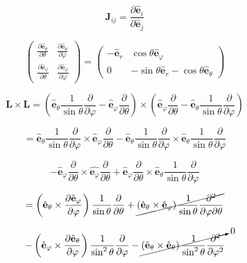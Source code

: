 \documentclass[12pt]{article}
\begin{document}
\[
    \textbf{J}_{ij} = \frac{\partial \hat{\mathbf{e}}_i}{\partial \hat{\mathbf{e}}_j}
\]

\[
    \left(
    \begin{array}{ccc}
            \frac{\partial \hat{\mathbf{e}}_\theta}{\partial \theta}  & \frac{\partial \hat{\mathbf{e}}_\theta}{\partial \varphi}  \\
            \frac{\partial \hat{\mathbf{e}}_\varphi}{\partial \theta} & \frac{\partial \hat{\mathbf{e}}_\varphi}{\partial \varphi}
        \end{array}
    \right)
    = \left(
    \begin{array}{ccc}
            - \hat{\mathbf{e}}_r & \cos{\theta} \hat{\mathbf{e}}_\varphi                                  \\
            0                    & - \sin \theta \hat{\mathbf{e}}_r - \cos \theta \hat{\mathbf{e}}_\theta
        \end{array}
    \right)
\]

\[
    \textbf{L} \times \textbf{L} =
    \left(
    \hat{\mathbf{e}}_\theta \frac{1}{\sin{\theta}} \frac{\partial}{\partial \varphi}
    - \hat{\mathbf{e}}_\varphi \frac{\partial}{\partial \theta}
    \right) \times
    \left(
    \hat{\mathbf{e}}_\varphi \frac{\partial}{\partial \theta}
    - \hat{\mathbf{e}}_\theta \frac{1}{\sin{\theta}} \frac{\partial}{\partial \varphi}
    \right)
\]

\[
    = \hat{\mathbf{e}}_\theta \frac{1}{\sin{\theta}} \frac{\partial}{\partial \varphi}
    \times \hat{\mathbf{e}}_\varphi \frac{\partial}{\partial \theta}
    - \hat{\mathbf{e}}_\theta \frac{1}{\sin{\theta}} \frac{\partial}{\partial \varphi}
    \times \hat{\mathbf{e}}_\theta \frac{1}{\sin{\theta}} \frac{\partial}{\partial \varphi}
\]

\[
    - \hat{\mathbf{e}}_\varphi \frac{\partial}{\partial \theta}
    \times \hat{\mathbf{e}_\varphi} \frac{\partial}{\partial \theta}
    + \hat{\mathbf{e}}_\varphi \frac{\partial}{\partial \theta}
    \times \hat{\mathbf{e}}_\theta \frac{1}{\sin{\theta}} \frac{\partial}{\partial \varphi}
\]

\[
    =\left(\hat{\mathbf{e}}_\theta \times \frac{\partial \hat{\mathbf{e}}_\varphi}{\partial \varphi}\right)
    \frac{1}{\sin{\theta}} \frac{\partial}{\partial \theta}
    + \cancel{\left(\hat{\mathbf{e}}_\theta \times \hat{\mathbf{e}}_\varphi\right)
        \frac{1}{\sin{\theta}} \frac{\partial^2}{\partial \varphi \partial \theta}}
\]

\[
    - \left(\hat{\mathbf{e}}_\varphi \times \frac{\partial \hat{\mathbf{e}}_\theta}{\partial \varphi}\right)
    \frac{1}{\sin^2{\theta}} \frac{\partial}{\partial \varphi}
    - \cancelto{0}{\left(\hat{\mathbf{e}}_\theta \times \hat{\mathbf{e}}_\theta\right)
    \frac{1}{\sin^2{\theta}} \frac{\partial^2}{\partial \varphi^2}}
\]
\end{document}
